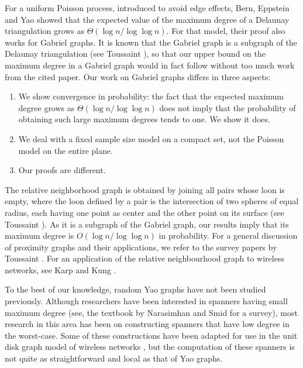 \documentclass[lotsofwhite,charterfonts]{patmorin}
\begin{document}
For a uniform Poisson process, introduced to avoid edge effects, Bern,
Eppstein and Yao \cite{bey91} showed that the expected value of the maximum
degree of a Delaunay triangulation grows as $\Theta(\log n/\log\log n)$.
For that model, their proof also works for Gabriel graphs.  It is known
that the Gabriel graph is a subgraph of the Delaunay triangulation (see
Toussaint \cite{t80b}), so that our upper bound on the maximum degree in a
Gabriel graph would in fact follow without too much work from the cited
paper.  Our work on Gabriel graphs differs in three aspects:

\begin{enumerate}
\item We show convergence in probability: the fact that the expected
maximum degree grows as $\Theta(\log n /\log \log n)$ does not imply that the
probability of obtaining such large maximum degrees tends to one. We
show it does.

\item We deal with a fixed sample size model on a compact set, not the
Poisson model on the entire plane.

\item Our proofs are different.
\end{enumerate}

The relative neighborhood graph is obtained by joining all pairs whose
loon is empty, where the loon defined by a pair is the intersection of two
spheres of equal radius, each having one point as center and the other
point on its surface (see Toussaint \cite{t80a}).  As it is a subgraph of
the Gabriel graph, our results imply that its maximum degree is $O(\log
n /\log \log n)$ in probability.  For a general discussion of proximity
graphs and their applications, we refer to the survey papers by Toussaint
\cite{t80b,t82}.  For an application of the relative neighbourhood graph to
wireless networks, see Karp and Kung \cite{kk00}.

To the best of our knowledge, random Yao graphs have not been studied
previously. Although researchers have been interested in spanners having
small maximum degree (see, the textbook by Narasimhan and Smid \cite{ns07}
for a survey), most research in this area has been on constructing spanners
that have low degree in the worst-case.  Some of these constructions have
been adapted for use in the unit disk graph model of wireless networks
\cite{wl06}, but the computation of these spanners is not quite as
straightforward and local as that of Yao graphs.
\end{document}
